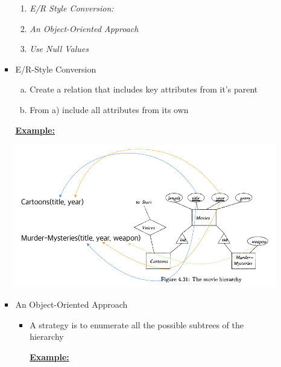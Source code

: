 \documentclass[12pt]{article}
\begin{document}
\begin{enumerate}[1.]
\begin{enumerate}[a)]
\begin{itemize}
            \begin{enumerate}[1.]
                \item \textit{E/R Style Conversion:}
                \item \textit{An Object-Oriented Approach}
                \item \textit{Use Null Values}
            \end{enumerate}
            \item E/R-Style Conversion
            \begin{enumerate}[a)]
                \item Create a relation that includes key attributes from it's parent
                \item From a) include all attributes from its own
            \end{enumerate}

            \bigskip

            \underline{\textbf{Example:}}

            \bigskip

            \begin{center}
            \includegraphics[width=\linewidth]{images/worksheet_14_solution_75.png}
            \end{center}

            \bigskip

            \item An Object-Oriented Approach

            \begin{itemize}
                \item A strategy is to enumerate all the possible subtrees of the hierarchy

                \bigskip

                \underline{\textbf{Example:}}


\end{itemize}
\end{itemize}
\end{enumerate}
\end{enumerate}
\end{document}
